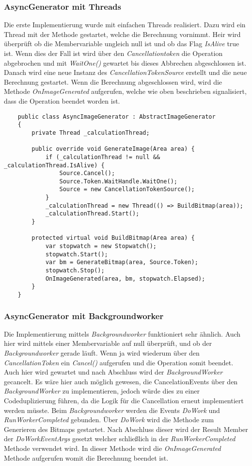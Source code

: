 \documentclass[a4paper,ngerman]{scrartcl}
\begin{document}
\subsubsection{AsyncGenerator mit Threads}
Die erste Implementierung wurde mit einfachen Threads realisiert. Dazu wird ein Thread mit der Methode gestartet, welche die Berechnung vornimmt. Heir wird überprüft ob die Membervariable ungleich null ist und ob das Flag \textit{IsAlive} true ist. Wenn dies der Fall ist wird über den \textit{Cancellationtoken} die Operation abgebrochen und mit\textit{ WaitOne()} gewartet bis dieses Abbrechen abgeschlossen ist. Danach wird eine neue Instanz des \textit{CancellationTokenSource} erstellt und die neue Berechnung gestartet. Wenn die Berechnung abgeschlossen wird, wird die Methode \textit{OnImageGenerated} aufgerufen, welche wie oben beschrieben signalisiert, dass die Operation beendet worden ist.

\begin{lstlisting}
    public class AsyncImageGenerator : AbstractImageGenerator
    {
        private Thread _calculationThread;

        public override void GenerateImage(Area area) {
            if (_calculationThread != null && _calculationThread.IsAlive) {
                Source.Cancel();
                Source.Token.WaitHandle.WaitOne();
                Source = new CancellationTokenSource();
            }
            _calculationThread = new Thread(() => BuildBitmap(area));
            _calculationThread.Start();
        }

        protected virtual void BuildBitmap(Area area) {
            var stopwatch = new Stopwatch();
            stopwatch.Start();
            var bm = GenerateBitmap(area, Source.Token);
            stopwatch.Stop();
            OnImageGenerated(area, bm, stopwatch.Elapsed);
        }
    }
\end{lstlisting}

\subsubsection{AsyncGenerator mit Backgroundworker}
Die Implementierung mittels \textit{Backgroundworker} funktioniert sehr ähnlich. Auch hier wird mittels einer Membervariable auf null überprüft, und ob der \textit{Backgroundworker} gerade läuft. Wenn ja wird wiederum über den \textit{CancellationToken} ein \textit{Cancel()} aufgerufen und die Operation somit beendet. Auch hier wird gewartet und nach Abschluss wird der \textit{BackgroundWorker} gecancelt. Es wäre hier auch möglich gewesen, die CancelationEvents über den \textit{BackgroundWorker} zu implementieren, jedoch würde dies zu einer Codeduplizierung führen, da die Logik für die Cancellation erneut implementiert werden müsste. Beim \textit{Backgroundworker} werden die Events \textit{DoWork} und \textit{RunWorkerCompleted} gebunden. Über \textit{DoWork} wird die Methode zum Generieren des Bitmaps gestartet. Nach Abschluss dieser wird der Result Member der \textit{DoWorkEventArgs} gesetzt welcher schließlich in der \textit{RunWorkerCompleted} Methode verwendet wird. In dieser Methode wird die \textit{OnImageGenerated} Methode aufgerufen womit die Berechnung beendet ist.
\end{document}
